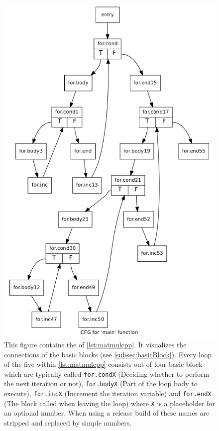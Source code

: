 \begin{figure}[!h]
    \caption[The CFG of \autoref{lst:matmulcpp}]{
        This figure contains the \cfg of \autoref{lst:matmulcpp}.
        It visualizes the connections of the basic blocks (see \autoref{subsec:basicBlock}).
        Every loop of the five within \autoref{lst:matmulcpp} consists out of four basic block which are typically called \texttt{for.condX} (Deciding whether to perform the next iteration or not), \texttt{for.bodyX} (Part of the loop body to execute), \texttt{for.incX} (Increment the iteration variable) and \texttt{for.endX} (The block called when leaving the loop) where \texttt{X} is a placeholder for an optional number.
        When using a release build of \llvm these names are stripped and replaced by simple numbers.
    }
    \label{fig:exampleCfg}
    \includegraphics[width=\textwidth]{gfx/matmulCfg.png}
\end{figure}
